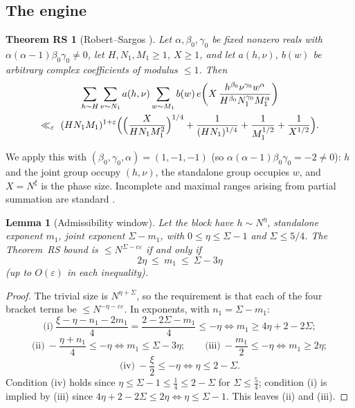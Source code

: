 \documentclass[11pt]{article}
\newtheorem{lemma}[theorem]{Lemma}
\newtheorem*{thmRS}{Theorem RS}
\theoremstyle{remark}
\newcommand{\N}{N}
\newcommand{\eof}[1]{e\!\left(#1\right)}
\begin{document}
\subsection{The engine}\label{sec:engine}

\begin{thmRS}[{Robert--Sargos \cite[Thm.~1]{RS}}]
Let $\alpha,\beta_0,\gamma_0$ be fixed nonzero reals with
$\alpha(\alpha-1)\beta_0\gamma_0\ne 0$, let $H,N_1,M_1\ge 1$, $X\ge 1$, and let
$a(h,\nu)$, $b(w)$ be arbitrary complex coefficients of modulus $\le 1$. Then
\begin{multline*}
\sum_{h\sim H}\sum_{\nu\sim N_1}a(h,\nu)\sum_{w\sim M_1}b(w)\,
\eof{X\,\frac{h^{\beta_0}\nu^{\gamma_0}w^{\alpha}}{H^{\beta_0}N_1^{\gamma_0}M_1^{\alpha}}}\\
\ll_{\varepsilon}\ (HN_1M_1)^{1+\varepsilon}
\Bigl(\Bigl(\frac{X}{HN_1M_1^{2}}\Bigr)^{1/4}+\frac{1}{(HN_1)^{1/4}}
+\frac{1}{M_1^{1/2}}+\frac{1}{X^{1/2}}\Bigr).
\end{multline*}
\end{thmRS}

We apply this with $(\beta_0,\gamma_0,\alpha)=(1,-1,-1)$ (so
$\alpha(\alpha-1)\beta_0\gamma_0=-2\ne0$): $h$ and the joint group occupy $(h,\nu)$,
the standalone group occupies $w$, and $X=\N^{\xi}$ is the phase size. Incomplete and
maximal ranges arising from partial summation are standard
\cite[Lemma~2]{RS}.

\begin{lemma}[Admissibility window]\label{lem:window}
Let the block have $h\sim\N^{\eta}$, standalone exponent $m_1$, joint exponent
$\Sigma-m_1$, with $0\le\eta\le\Sigma-1$ and $\Sigma\le 5/4$. The Theorem~RS bound is
$\le \N^{\Sigma-c\varepsilon}$ if and only if
\[
2\eta\ \le\ m_1\ \le\ \Sigma-3\eta
\]
(up to $O(\varepsilon)$ in each inequality).
\end{lemma}

\begin{proof}
The trivial size is $\N^{\eta+\Sigma}$, so the requirement is that each of the four
bracket terms be $\le \N^{-\eta-c\varepsilon}$. In exponents, with $n_1=\Sigma-m_1$:
\[
\text{(i)}\ \frac{\xi-\eta-n_1-2m_1}{4}=\frac{2-2\Sigma-m_1}{4}\le-\eta
\iff m_1\ge 4\eta+2-2\Sigma;
\]
\[
\text{(ii)}\ -\frac{\eta+n_1}{4}\le-\eta\iff m_1\le \Sigma-3\eta;\qquad
\text{(iii)}\ -\frac{m_1}{2}\le-\eta\iff m_1\ge 2\eta;
\]
\[
\text{(iv)}\ -\frac{\xi}{2}\le-\eta\iff \eta\le 2-\Sigma .
\]
Condition (iv) holds since $\eta\le\Sigma-1\le\frac14\le 2-\Sigma$ for
$\Sigma\le\frac54$; condition (i) is implied by (iii) since
$4\eta+2-2\Sigma\le 2\eta\iff\eta\le\Sigma-1$. This leaves (ii) and (iii).
\end{proof}
\end{document}

